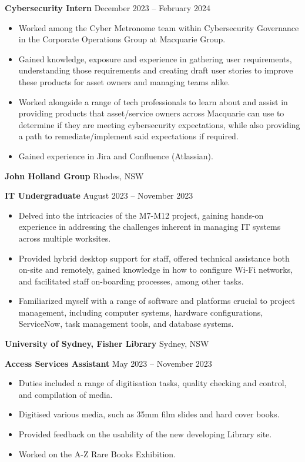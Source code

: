 \documentclass[11pt]{article}
\begin{document}
\textbf{Cybersecurity Intern} \hfill December 2023 – February 2024
\begin{itemize}[noitemsep, topsep=0pt, partopsep=0pt, parsep=0pt]
    \item Worked among the Cyber Metronome team within Cybersecurity Governance in the Corporate Operations Group at Macquarie Group.
    \item Gained knowledge, exposure and experience in gathering user requirements, understanding those requirements and creating draft user stories to improve these products for asset owners and managing teams alike.
    \item Worked alongside a range of tech professionals to learn about and assist in providing products that asset/service owners across Macquarie can use to determine if they are meeting cybersecurity expectations, while also providing a path to remediate/implement said expectations if required.
    \item Gained experience in Jira and Confluence (Atlassian).
\end{itemize}

\vspace{12pt}

\textbf{John Holland Group} \hfill Rhodes, NSW

\textbf{IT Undergraduate} \hfill August 2023 – November 2023
\begin{itemize}[noitemsep, topsep=0pt, partopsep=0pt, parsep=0pt]
    \item Delved into the intricacies of the M7-M12 project, gaining hands-on experience in addressing the challenges inherent in managing IT systems across multiple worksites. 
    \item Provided hybrid desktop support for staff, offered technical assistance both on-site and remotely, gained knowledge in how to configure Wi-Fi networks, and facilitated staff on-boarding processes, among other tasks. 
    \item Familiarized myself with a range of software and platforms crucial to project management, including computer systems, hardware configurations, ServiceNow, task management tools, and database systems. 
\end{itemize}

\vspace{12pt}

\textbf{University of Sydney, Fisher Library} \hfill Sydney, NSW

\textbf{Access Services Assistant} \hfill May 2023 – November 2023
\begin{itemize}[noitemsep, topsep=0pt, partopsep=0pt, parsep=0pt]
    \item Duties included a range of digitisation tasks, quality checking and control, and compilation of media. 
    \item Digitised various media, such as 35mm film slides and hard
cover books.
    \item Provided feedback on the usability of the new developing Library site.
    \item Worked on the A-Z Rare Books Exhibition.
\end{itemize}
\end{document}
